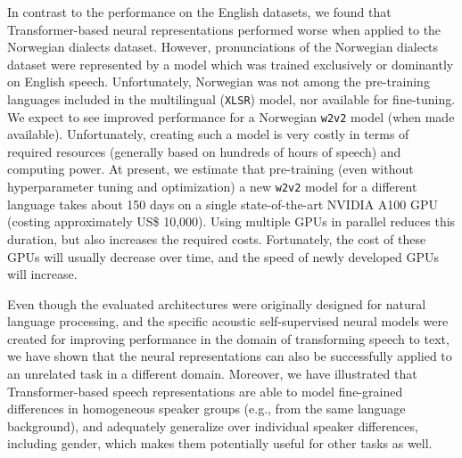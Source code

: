 \documentclass[11pt,a4paper]{article}
\begin{document}
In contrast to the performance on the English datasets, we found that Transformer-based neural representations performed worse when applied to the Norwegian dialects dataset. However, pronunciations of the Norwegian dialects dataset were represented by a model which was trained exclusively or dominantly on English speech. Unfortunately, Norwegian was not among the pre-training languages included in the multilingual (\texttt{XLSR}) model, nor available for fine-tuning. We expect to see improved performance for a Norwegian \texttt{w2v2} model (when made available). Unfortunately, creating such a model is very costly in terms of required resources (generally based on hundreds of hours of speech) and computing power.
At present, we estimate that pre-training (even without hyperparameter tuning and optimization) a new \texttt{w2v2} model for a different language takes about 150 days on a single state-of-the-art NVIDIA A100 GPU (costing approximately US\$ 10,000). Using multiple GPUs in parallel reduces this duration, but also increases the required costs. Fortunately, the cost of these GPUs will usually decrease over time, and the speed of newly developed GPUs will increase.



Even though the evaluated architectures were originally designed for natural language processing, and the specific acoustic self-supervised neural models were created for improving performance in the domain of transforming speech to text, we have shown that the neural representations can also be successfully applied to an unrelated task in a different domain.
Moreover, we have illustrated that Transformer-based speech representations are able to model fine-grained differences in homogeneous speaker groups (e.g., from the same language background), and adequately generalize over individual speaker differences, including gender, which makes them potentially useful for other tasks as well.
\end{document}

